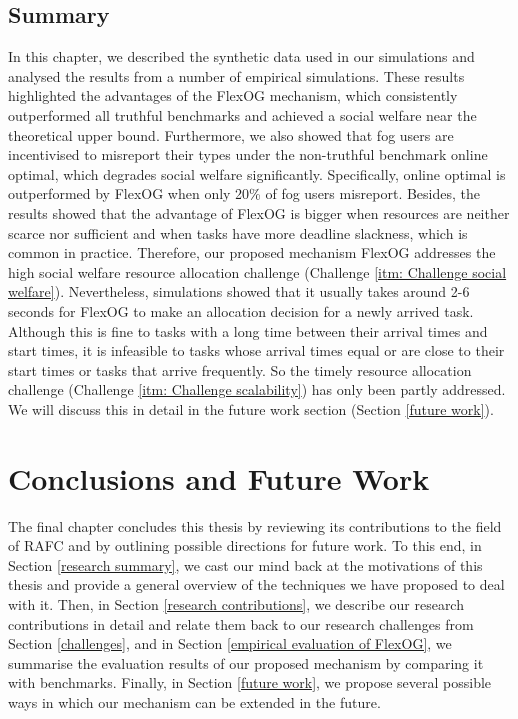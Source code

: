 \documentclass[11pt]{phdthesis}
\begin{document}
\section{Summary}
In this chapter, we described the synthetic data used in our simulations and analysed the results from a number of empirical simulations. These results highlighted the advantages of the FlexOG mechanism, which consistently outperformed all truthful benchmarks and achieved a social welfare near the theoretical upper bound. Furthermore, we also showed that fog users are incentivised to misreport their types under the non-truthful benchmark online optimal, which degrades social welfare significantly. Specifically, online optimal is outperformed by FlexOG when only 20\% of fog users misreport. Besides, the results showed that the advantage of FlexOG is bigger when resources are neither scarce nor sufficient and when tasks have more deadline slackness, which is common in practice. Therefore, our proposed mechanism FlexOG addresses the high social welfare resource allocation challenge (Challenge \ref{itm: Challenge social welfare}). Nevertheless, simulations showed that it usually takes around 2-6 seconds for FlexOG to make an allocation decision for a newly arrived task. Although this is fine to tasks with a long time between their arrival times and start times, it is infeasible to tasks whose arrival times equal or are close to their start times or tasks that arrive frequently. So the timely resource allocation challenge (Challenge \ref{itm: Challenge scalability}) has only been partly addressed. We will discuss this in detail in the future work section (Section \ref{future work}).

\chapter{Conclusions and Future Work} \label{conclusions and future work}

The final chapter concludes this thesis by reviewing its contributions to the field of RAFC and by outlining possible directions for future work. To this end, in Section \ref{research summary}, we cast our mind back at the motivations of this thesis and provide a general overview of the techniques we have proposed to deal with it. Then, in Section \ref{research contributions}, we describe our research contributions in detail and relate them back to our research challenges from Section \ref{challenges}, and in Section \ref{empirical evaluation of FlexOG}, we summarise the evaluation results of our proposed mechanism by comparing it with benchmarks. Finally, in Section \ref{future work}, we propose several possible ways in which our mechanism can be extended in the future.
\end{document}
